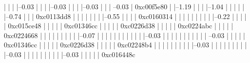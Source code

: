             |          |          
            |          |--0.03%
            |          |          
            |          |--0.03%
            |          |          
            |          |--0.03%
            |          |          
            |           --0.03%
            |                     0xc00f5e80
            |          
            |--1.19%
            |          |          
            |          |--1.04%
            |          |          |          
            |          |          |--0.74%
            |          |          |          0xc0113dd8
            |          |          |          |          
            |          |          |          |--0.55%
            |          |          |          |          0xc0160314
            |          |          |          |          |          
            |          |          |          |          |--0.22%
            |          |          |          |          |          0xc015ce48
            |          |          |          |          |          0xc01346cc
            |          |          |          |          |          0xc0226d38
            |          |          |          |          |          0xc0224abc
            |          |          |          |          |          0xc0224668
            |          |          |          |          |          
            |          |          |          |          |--0.07%
            |          |          |          |          |          |          
            |          |          |          |          |          |--0.03%
            |          |          |          |          |          |          
            |          |          |          |          |           --0.03%
            |          |          |          |          |                     0xc01346cc
            |          |          |          |          |                     0xc0226d38
            |          |          |          |          |                     0xc02248b4
            |          |          |          |          |          
            |          |          |          |          |--0.03%
            |          |          |          |          |          
            |          |          |          |          |--0.03%
            |          |          |          |          |          
            |          |          |          |          |--0.03%
            |          |          |          |          |          0xc016448c

